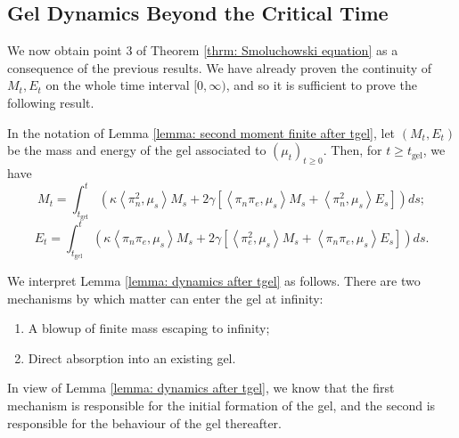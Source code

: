 \subsection{Gel Dynamics Beyond the Critical Time} We now obtain point 3 of Theorem \ref{thrm: Smoluchowski equation}  as a consequence of the previous results. We have already proven the continuity of $M_t, E_t$ on the whole time interval $[0,\infty)$, and so it is sufficient to prove the following result.
\begin{lemma}\label{lemma: dynamics after tgel} In the notation of Lemma \ref{lemma: second moment finite after tgel}, let $(M_t, E_t)$ be the mass and energy of the gel associated to $(\mu_t)_{t\ge 0}$. Then, for  $t\ge t_\mathrm{gel}$, we have \begin{equation}
    M_t=\int_{t_\mathrm{gel}}^t 
    \left(
      \kappa \left<\pi_n^2,\mu_s\right>M_s +
      2\gamma \left[
        \left<\pi_n \pi_e,\mu_s \right>M_s +
        \left<\pi_n^2,\mu_s \right>E_s \right]
    \right)ds;
\end{equation}
\begin{equation}
    E_t=\int_{t_\mathrm{gel}}^t 
    \left(
      \kappa \left<\pi_n \pi_e,\mu_s\right>M_s +
      2\gamma \left[
        \left<\pi_e^2,\mu_s \right>M_s +
        \left<\pi_n \pi_e,\mu_s \right>E_s \right]
    \right)ds.
\end{equation}\end{lemma} \begin{remark}\label{rmk: continuity of tgelt} We interpret Lemma \ref{lemma: dynamics after tgel} as follows. There are two mechanisms by which matter can enter the gel at infinity: \begin{enumerate}[label=\roman{*}).]
    \item A blowup of finite mass escaping to infinity;
    \item Direct absorption into an existing gel.
\end{enumerate} In view of Lemma \ref{lemma: dynamics after tgel}, we know that the first mechanism is responsible for the initial formation of the gel, and the second is responsible for the behaviour of the gel thereafter.  \end{remark}
